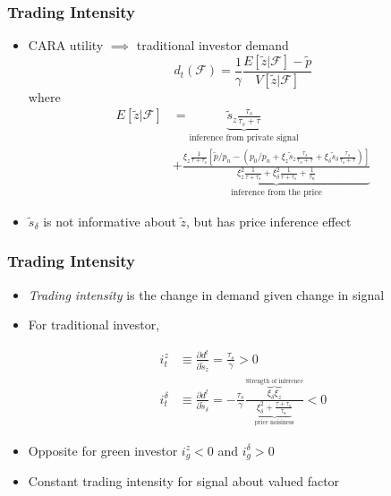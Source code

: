 \documentclass{beamer}
\begin{document}
\begin{frame}
\frametitle{Trading Intensity}
\begin{itemize}[<+->]
\item CARA utility $\implies$ traditional investor demand
$$
d_t(\mathcal{F}) 
=
\frac{1}{\gamma} 
\frac{E[\tilde z | \mathcal{F}] - \tilde p}{V[\tilde z | \mathcal{F}]}
$$
where 
\begin{align*}
E[\tilde z | \mathcal{F}] 
&= 
\underbrace{\tilde s_z \frac{\tau_s}{\tau_s + \tau}}_{\text{inference from private signal}}\\
&+ 
\underbrace{\frac{\xi_z \frac{1}{\tau + \tau_s}[\tilde p/ p_n - (p_0/p_n + \xi_z \tilde s_z \frac{\tau_s}{\tau_s + \tau} + \xi_\delta \tilde s_\delta \frac{\tau_s}{\tau_s + \tau})]}{\xi_z^2 \frac{1}{\tau + \tau_s} + \xi_\delta^2 \frac{1}{\tau + \tau_s} + \frac{1}{\tau_n}}}_{\text{inference from the price}}
\end{align*}

\item $\tilde s_\delta$ is not informative about $\tilde z$, but has price inference effect

\end{itemize}
\end{frame}


\begin{frame}
\frametitle{Trading Intensity}
\begin{itemize}[<+->]
\item \textit{Trading intensity} is the change in demand given change in signal

\bigskip

\item For traditional investor,

\begin{align*}
i_t^z &\equiv \frac{\partial d^t}{\partial \tilde s_z} = \frac{\tau_s}{\gamma} > 0\\
i_t^\delta &\equiv \frac{\partial d^t}{\partial \tilde s_\delta} = -\frac{\tau_s}{\gamma} \frac{\overbrace{\xi_\delta \xi_z}^{\text{Strength of inference}}}{ \underbrace{\xi_\delta^2 + \frac{\tau + \tau_s}{\tau_n}}_{\text{price noisiness}}} < 0
\end{align*}

\item Opposite for green investor $i_g^z < 0$ and $i_g^\delta > 0$

\bigskip

\item Constant trading intensity for signal about valued factor

\end{itemize}
\end{frame}
\end{document}

